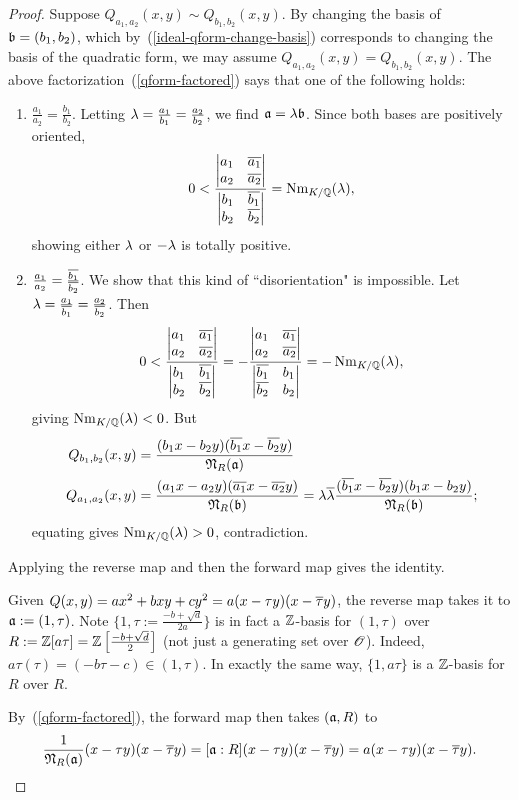 \begin{proof}
Suppose $Q_{a_1,a_2}(x,y)\sim Q_{b_1,b_2}(x,y)$. By changing the basis of $\mathfrak{b}=(b_1,b_2)$, which by~(\ref{ideal-qform-change-basis}) corresponds to changing the basis of the quadratic form, we may assume $Q_{a_1,a_2}(x,y)= Q_{b_1,b_2}(x,y)$. The above factorization~(\ref{qform-factored}) says that one of the following holds:
\begin{enumerate}
\item $\frac{a_1}{a_2}=\frac{b_1}{b_2}$. Letting $\lambda=\frac{a_1}{b_1}=\frac{a_2}{b_2}$, we find $\mathfrak{a}=\lambda\mathfrak{b}$. Since both bases are positively oriented,
\[
0<\frac{\left| { \begin{matrix} {a_1}&{\overline{a_1}}\\ {a_2}&{\overline{a_2}} \end{matrix} } \right|}{\left| { \begin{matrix} {b_1}&{\overline{b_1}}\\ {b_2}&{\overline{b_2}} \end{matrix} } \right|}=\operatorname{Nm}_{K/\mathbb{Q}}(\lambda),
\]
showing either $\lambda$ or $-\lambda$ is totally positive.
\item $\frac{a_1}{a_2}=\frac{\overline{b_1}}{\overline{b_2}}$. We show that this kind of ``disorientation" is impossible. Let $\lambda=\frac{a_1}{\overline{b_1}}=\frac{a_2}{\overline{b_2}}$. Then
\[
0<\frac{\left| { \begin{matrix} {a_1}&{\overline{a_1}}\\ {a_2}&{\overline{a_2}} \end{matrix} } \right|}{\left| { \begin{matrix} {b_1}&{\overline{b_1}}\\ {b_2}&{\overline{b_2}} \end{matrix} } \right|}=-\frac{\left| { \begin{matrix} {a_1}&{\overline{a_1}}\\ {a_2}&{\overline{a_2}} \end{matrix} } \right|}{\left| { \begin{matrix} {\overline{b_1}}&{b_1}\\ {\overline{b_2}}&{b_2} \end{matrix} } \right|}=-\operatorname{Nm}_{K/\mathbb{Q}}(\lambda),
\]
giving $\operatorname{Nm}_{K/\mathbb{Q}}(\lambda)<0$. But
\begin{align*}
Q_{b_1,b_2}(x,y)&=\frac{(b_1x-b_2y)(\overline{b_1}x-\overline{b_2}y)}{\mathfrak N_R(\mathfrak{a})}\\
Q_{a_1,a_2}(x,y)&=\frac{(a_1x-a_2y)(\overline{a_1}x-\overline{a_2}y)}{\mathfrak N_R(\mathfrak{b})}
=\lambda\overline{\lambda}\frac{(\overline{b_1}x-\overline{b_2}y)(b_1x-b_2y)}{\mathfrak N_R(\mathfrak{b})};
\end{align*}
equating gives $\operatorname{Nm}_{K/\mathbb{Q}}(\lambda)>0$, contradiction.
\end{enumerate}
 Applying the reverse map and then the forward map gives the identity.

Given $Q(x,y)=ax^2+bxy+cy^2=a(x-\tau y)(x-\overline{\tau}y)$, the reverse map takes it to $\mathfrak{a}:=(1,\tau)$.
Note $\{1,\tau:=\frac{-b+\sqrt{d}}{2a}\}$ is in fact a $\mathbb{Z}$-basis for $(1,\tau)$ over $R:=\mathbb{Z}[a\tau]=\mathbb{Z}\left[ {\frac{-b+\sqrt{d}}{2}} \right]$ (not just a generating set over $\mathscr{O}$). Indeed, $a\tau(\tau)=(-b\tau-c)\in (1,\tau)$. In exactly the same way, $\{1,a\tau\}$ is a $\mathbb{Z}$-basis for $R$ over $R$.

By~(\ref{qform-factored}), the forward map then takes $(\mathfrak{a},R)$ to
\[\frac{1}{\mathfrak N_R(\mathfrak{a})}(x-\tau y)(x-\overline{\tau} y)=
[\mathfrak{a}:R](x-\tau y)(x-\overline{\tau} y)=
a(x-\tau y)(x-\overline{\tau} y).\]


\end{proof}
